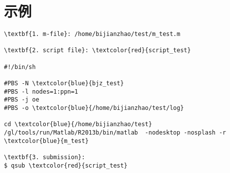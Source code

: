 \documentclass{ctexart}
\begin{document}
\section{示例}
\begin{Verbatim}[frame=single,framesep=1mm,baselinestretch=0.8,commandchars=\\\{\}]
\textbf{1. m-file}: /home/bijianzhao/test/m_test.m

\textbf{2. script file}: \textcolor{red}{script_test}

#!/bin/sh

#PBS -N \textcolor{blue}{bjz_test}
#PBS -l nodes=1:ppn=1
#PBS -j oe
#PBS -o \textcolor{blue}{/home/bijianzhao/test/log}

cd \textcolor{blue}{/home/bijianzhao/test}
/gl/tools/run/Matlab/R2013b/bin/matlab  -nodesktop -nosplash -r \textcolor{blue}{m_test}

\textbf{3. submission}:
$ qsub \textcolor{red}{script_test}
\end{Verbatim}
\end{document}
